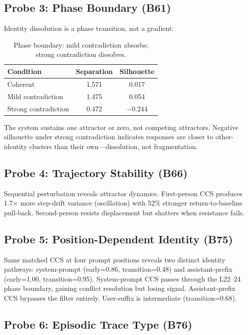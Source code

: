 \documentclass[11pt,a4paper]{article}
\begin{document}
\subsection{Probe 3: Phase Boundary (B61)}

Identity dissolution is a phase transition, not a gradient:

\begin{table}[h]
\centering
\begin{tabular}{lcc}
\toprule
Condition & Separation & Silhouette \\
\midrule
Coherent & 1.571 & 0.017 \\
Mild contradiction & 1.475 & 0.054 \\
Strong contradiction & 0.472 & $-$0.244 \\
\bottomrule
\end{tabular}
\caption{Phase boundary: mild contradiction absorbs; strong contradiction dissolves.}
\end{table}

The system sustains one attractor or zero, not competing attractors. Negative
silhouette under strong contradiction indicates responses are closer to
other-identity clusters than their own---dissolution, not fragmentation.

\subsection{Probe 4: Trajectory Stability (B66)}

Sequential perturbation reveals attractor dynamics. First-person CCS produces 1.7$\times$
more step-drift variance (oscillation) with 52\% stronger return-to-baseline pull-back.
Second-person resists displacement but shatters when resistance fails.

\subsection{Probe 5: Position-Dependent Identity (B75)}

Same matched CCS at four prompt positions reveals two distinct identity pathways:
system-prompt (early=0.86, transition=0.48) and assistant-prefix (early=1.00,
transition=0.95). System-prompt CCS passes through the L22--24 phase boundary,
gaining conflict resolution but losing signal. Assistant-prefix CCS bypasses
the filter entirely. User-suffix is intermediate (transition=0.68).

\subsection{Probe 6: Episodic Trace Type (B76)}
\end{document}
